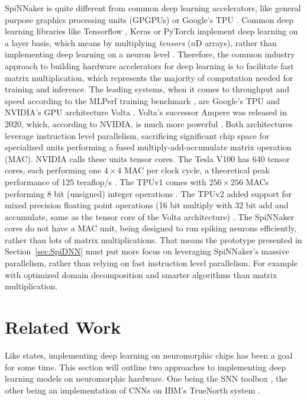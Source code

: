 \documentclass[]{article}
\begin{document}
SpiNNaker is quite different from common deep learning accelerators,
like general purpose graphics processing units (GPGPUs) or Google's
TPU \citep{jouppi_et_al_2017}.
Common deep learning libraries like Tensorflow
\citep{abadi_et_al_2015}, Keras \citep{keras} or PyTorch
\citep{paszke_et_al_2019} implement
deep learning on a layer basis, which means by multiplying
\textit{tensors} ($n$D arrays), rather than implementing deep learning
on a neuron level \citep{goodfellow_et_al_2016}.
Therefore, the common industry approach to building hardware
accelerators for deep learning is to facilitate fast matrix
multiplication, which represents the majority of computation needed
for training and inference.
The leading systems, when it comes to throughput and speed according
to the MLPerf training benchmark \citep{mlperf_2019}, are Google's
TPU \citep{jouppi_et_al_2017} and NVIDIA's GPU architecture
Volta \citep{durant_et_al_2017}.
Volta's successor Ampere was released in 2020, which, according to
NVIDIA, is much more powerful \citep{krashinsky_et_al_2020}.
Both architectures leverage instruction level parallelism, sacrificing
significant chip space for specialized units performing a
fused multiply-add-accumulate matrix operation (MAC).
NVIDIA calls these units tensor cores. The Tesla V100 has 640 tensor
cores, each performing one $4\times 4$ MAC per clock cycle, a
theoretical peak performance of 125 teraflop/s
\citep{markidis_et_al_2018}.
The TPUv1 comes with $256\times256$ MACs performing 8 bit (unsigned)
integer operations \citep{jouppi_et_al_2017}.
The TPUv2 added support for mixed precision floating point operations
(16 bit multiply with 32 bit add and accumulate, same as the
tensor core of the Volta architecture)
\citep{kennedy_2017, markidis_et_al_2018}.
The SpiNNaker cores do not have a MAC unit, being designed to run
spiking neurons efficiently, rather than lots of matrix
multiplications.
That means the prototype presented in Section~\ref{sec:SpiDNN} must
put more focus on leveraging SpiNNaker's massive parallelism, rather
than relying on fast instruction level parallelism.
For example with optimized domain decomposition and smarter algorithms
than matrix multiplication.




\section{Related Work} %
\label{sec:related_work}

Like \citet{gomes_2017} states, implementing deep learning on
neuromorphic chips has been a goal for some time.
This section will outline two approaches to implementing deep learning
models on neuromorphic hardware.
One being the SNN toolbox \citep{rueckauer_et_al_2017}, the other
being an implementation of CNNs on IBM's TrueNorth system
\citep{esser_et_al_2016}.
\end{document}
